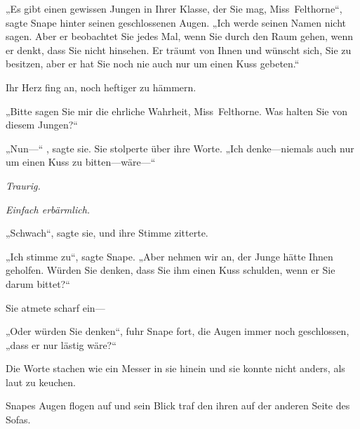 „Es gibt einen gewissen Jungen in Ihrer Klasse, der Sie mag, Miss~Felthorne“, sagte Snape hinter seinen geschlossenen Augen. „Ich werde seinen Namen nicht sagen. Aber er beobachtet Sie jedes Mal, wenn Sie durch den Raum gehen, wenn er denkt, dass Sie nicht hinsehen. Er träumt von Ihnen und wünscht sich, Sie zu besitzen, aber er hat Sie noch nie auch nur um einen Kuss gebeten.“

Ihr Herz fing an, noch heftiger zu hämmern.

„Bitte sagen Sie mir die ehrliche Wahrheit, Miss~Felthorne. Was halten Sie von diesem Jungen?“

„Nun—“ , sagte sie. Sie stolperte über ihre Worte. „Ich denke—niemals auch nur um einen Kuss zu bitten—wäre—“

\emph{Traurig.}

\emph{Einfach erbärmlich.}

„Schwach“, sagte sie, und ihre Stimme zitterte.

„Ich stimme zu“, sagte Snape. „Aber nehmen wir an, der Junge hätte Ihnen geholfen. Würden Sie denken, dass Sie ihm einen Kuss schulden, wenn er Sie darum bittet?“

Sie atmete scharf ein—

„Oder würden Sie denken“, fuhr Snape fort, die Augen immer noch geschlossen, „dass er nur lästig wäre?“

Die Worte stachen wie ein Messer in sie hinein und sie konnte nicht anders, als laut zu keuchen.

Snapes Augen flogen auf und sein Blick traf den ihren auf der anderen Seite des Sofas.

